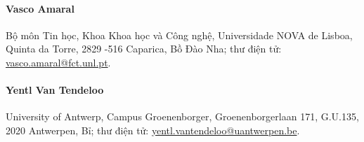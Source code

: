 \paragraph{Vasco Amaral}
Bộ môn Tin học, Khoa Khoa học và Công nghệ, Universidade NOVA de Lisboa, Quinta da Torre, 2829 -516 Caparica, Bồ Đào Nha; thư điện tử: \url{vasco.amaral@fct.unl.pt}.

\paragraph{Yentl Van Tendeloo}
University of Antwerp, Campus Groenenborger, Groenenborgerlaan 171, G.U.135, 2020 Antwerpen, Bỉ; thư điện tử: \url{yentl.vantendeloo@uantwerpen.be}.
